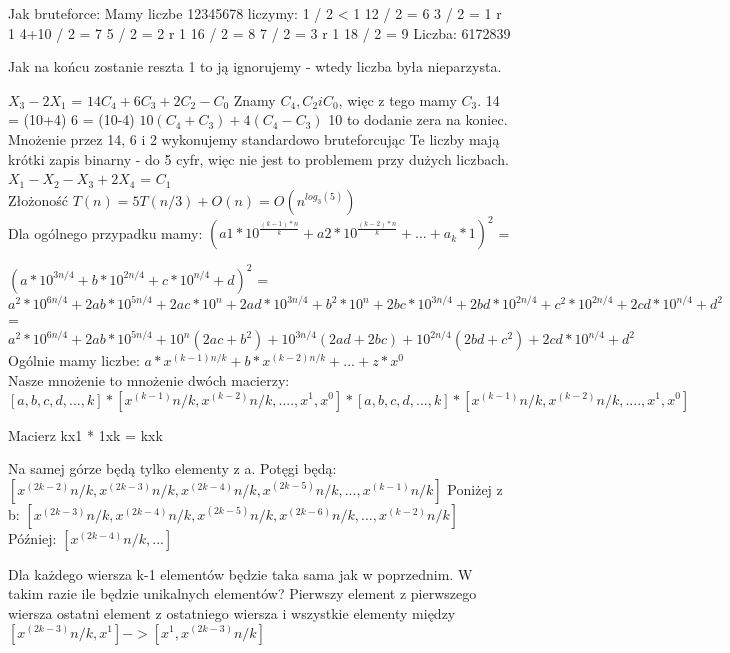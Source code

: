 \documentclass[12pt]{article}
\begin{document}
Jak bruteforce:
Mamy liczbe 12345678 
liczymy:
1 / 2 < 1 
12 / 2 = 6
3 / 2 = 1 r 1
4+10 / 2 = 7 
5 / 2 = 2 r 1 
16 / 2 = 8 
7 / 2 = 3 r 1
18 / 2 = 9 
Liczba:
6172839 

Jak na końcu zostanie reszta 1 to ją ignorujemy - wtedy liczba była nieparzysta.

$X_3 - 2X_1$ = $14C_4 + 6C_3 + 2C_2 - C_0$ 
Znamy $C_4, C_2 i C_0$, więc z tego mamy $C_3$.
14 = (10+4)
6 = (10-4)
$10(C_4 + C_3) + 4(C_4 - C_3)$
10 to dodanie zera na koniec.
Mnożenie przez 14, 6 i 2 wykonujemy standardowo bruteforcując Te liczby mają krótki zapis binarny - do 5 cyfr, więc nie jest to problemem przy dużych liczbach.\\

$X_1 - X_2 - X_3 + 2X_4$ = $C_1$\\

Złożoność $T(n) = 5T(n/3) + O(n) = O(n^{log_3(5)})$\\


Dla ogólnego przypadku mamy:
$(a1*10^\frac{(k-1)*n}{k}+a2*10^\frac{(k-2)*n}{k}+...+a_k*1)^2$ = 


$(a*10^{3n/4}+b*10^{2n/4}+c*10^{n/4}+d)^2$ = $a^2*10^{6n/4}+2ab*10^{5n/4}+2ac*10^n+2ad*10^{3n/4}+b^2*10^{n}+2bc*10^{3n/4}+2bd*10^{2n/4}+c^2*10^{2n/4}+2cd*10^{n/4}+d^2$ = $a^2*10^{6n/4}+2ab*10^{5n/4}+10^n (2ac + b^2) + 10^{3n/4} (2ad + 2bc) + 10^{2n/4} (2bd + c^2) + 2cd * 10^{n/4} + d^2$\\





Ogólnie mamy liczbe:
$a * x^{(k-1)n/k} + b * x^{(k-2)n/k} + ... + z * x^0$\\

Nasze mnożenie to mnożenie dwóch macierzy:
$[a, b, c, d, ..., k] * [x^(k-1)n/k, x^(k-2)n/k, ...., x^1, x^0] * [a, b, c, d, ..., k] * [x^(k-1)n/k, x^(k-2)n/k, ...., x^1, x^0] $

Macierz kx1 * 1xk = kxk  

Na samej górze będą tylko elementy z a.
Potęgi będą:
$[x^(2k-2)n/k, x^(2k-3)n/k, x^(2k-4)n/k, x^(2k-5)n/k, ..., x^(k-1)n/k]$
Poniżej z b:
$[x^(2k-3)n/k, x^(2k-4)n/k, x^(2k-5)n/k, x^(2k-6)n/k, ..., x^(k-2)n/k]$
Później:
$[x^(2k-4)n/k, ...]$

Dla każdego wiersza k-1 elementów będzie taka sama jak w poprzednim. 
W takim razie ile będzie unikalnych elementów?
Pierwszy element z pierwszego wiersza 
ostatni element z ostatniego wiersza 
i wszystkie elementy między $[x^(2k-3)n/k, x^1] -> [x^1, x^(2k-3)n/k]$ 
\end{document}
